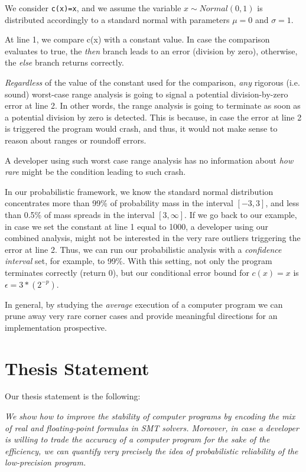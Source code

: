 We consider \lstinline{c(x)=x}, and we assume the variable $x\sim Normal(0,1)$ is distributed accordingly to a standard normal with parameters $\mu = 0$ and $\sigma = 1$.
%

At line 1, we compare c(x) with a constant value.
%
In case the comparison evaluates to true, the \emph{then} branch leads to an error (division by zero), otherwise, the \emph{else} branch returns correctly.
%

\emph{Regardless} of the value of the constant used for the comparison, \emph{any} rigorous (i.e. sound) worst-case range analysis is going to signal a potential division-by-zero error at line 2.
%
In other words, the range analysis is going to terminate as soon as a potential division by zero is detected.
%
This is because, in case the error at line 2 is triggered the program would crash, and thus, it would not make sense to reason about ranges or roundoff errors.

%
A developer using such worst case range analysis has no information about \emph{how rare} might be the condition leading to such crash. 
%

In our probabilistic framework, we know the standard normal distribution concentrates more than 99\% of probability mass in the interval $[−3, 3]$, and less than 0.5\% of mass spreads in the interval $[3, \infty]$.
%
If we go back to our example, in case we set the constant at line 1 equal to 1000, a developer using our combined analysis, might not be interested in the very rare outliers triggering the error at line 2.
%
Thus, we can run our probabilistic analysis with a \emph{confidence interval} set, for example, to 99\%.
%
%
With this setting, not only the program terminates correctly (return 0), but our conditional error bound for $c(x)=x$ is $\epsilon = 3*(2^{-p})$.
%

In general, by studying the \emph{average} execution of a computer program we can prune away very rare corner cases and provide meaningful directions for an implementation prospective.
%
\section{Thesis Statement}
%
Our thesis statement is the following: 

%
\emph{We show how to improve the stability of computer programs by encoding the mix of real and floating-point formulas in SMT solvers.
%
Moreover, in case a developer is willing to trade the accuracy of a computer program for the sake of the efficiency, we can quantify very precisely the idea of probabilistic reliability of the low-precision program.}

